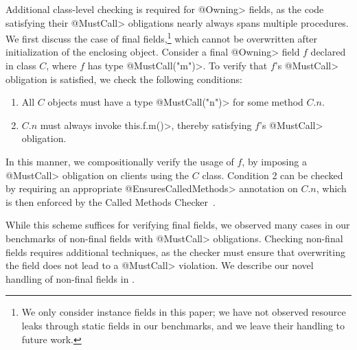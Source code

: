   Additional class-level checking is required for \<@Owning> fields, as the code
  satisfying their \<@MustCall> obligations nearly always spans multiple
  procedures.  We first discuss the case of final fields,\footnote{We only
  consider instance fields in this paper; we have not observed resource leaks
  through static fields in our benchmarks, and we leave their handling to future
  work.} which cannot be overwritten after initialization of the enclosing
  object.  Consider a final \<@Owning> field $f$ declared in class $C$, where
  $f$ has type \<@MustCall("m")>.  To
  verify that $f$'s \<@MustCall> obligation is satisfied, we check the following
  conditions:
  \begin{enumerate}
    \item All $C$ objects must have a type \<@MustCall("n")> for some method $C.n$.
    \item $C.n$ must always invoke \<this.f.m()>, thereby satisfying $f$'s
    \<@MustCall> obligation.
  \end{enumerate}
  In this manner, we compositionally verify the usage of $f$, by imposing
  a \<@MustCall> obligation on clients using the $C$ class.  Condition 2 can be
  checked by requiring an appropriate \<@EnsuresCalledMethods> annotation on
  $C.n$, which is then enforced by the Called Methods
  Checker~\cite{kellogg20verifying}.  

  While this scheme suffices for verifying final fields, we observed many cases
  in our benchmarks of non-final fields with \<@MustCall> obligations.  Checking
  non-final fields requires additional techniques, as the checker must ensure
  that overwriting the field does not lead to a \<@MustCall> violation.  We
  describe our novel handling of non-final fields in .

